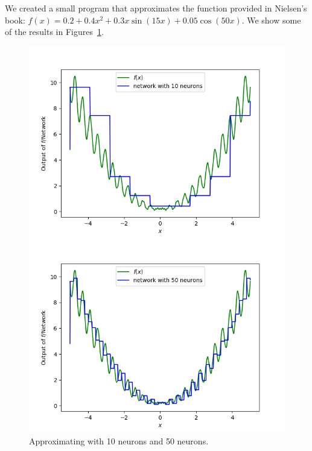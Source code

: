 We created a small program that approximates the function provided in 
Nielsen's book: $f(x) = 0.2 + 0.4 x^2 + 0.3 x \sin(15 x) + 0.05 \cos(50 x)$. 
We show some of the results in Figures~\ref{fig:one_variable_10neurons}.
\begin{figure}[ht]
\centering
\begin{minipage}[b]{0.4\textwidth}
\begin{center}
\includegraphics[width=\textwidth]{OneVar10Neurons.png} 
\end{center}
\end{minipage}
\hfill
\begin{minipage}[b]{0.4\textwidth}
\begin{center}
\includegraphics[width=\textwidth]{OneVar50Neurons.png} 
\end{center}
\end{minipage}
\caption{Approximating with 10 neurons and 50 neurons.}
\label{fig:one_variable_10neurons}
\end{figure}

